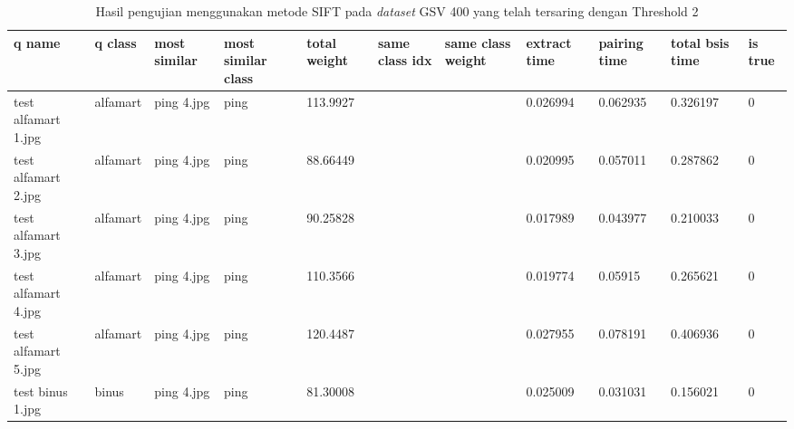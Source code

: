 \begin{landscape}
	\begin{longtable}{|p{2cm}|p{1.5cm}|p{2cm}|p{1.5cm}|p{2cm}|p{1cm}|p{2cm}|p{2cm}|p{2cm}|p{2cm}|p{1cm}|}
		\caption{Hasil pengujian menggunakan metode SIFT pada \textit{dataset} GSV 400 yang telah tersaring dengan Threshold 2} \\
		\hline
		\textbf{q name}      & \textbf{q class} & \textbf{most similar} & \textbf{most similar class} & \textbf{total weight} & \textbf{same class idx} & \textbf{same class weight} & \textbf{extract time} & \textbf{pairing time} & \textbf{total bsis time} & \textbf{is true} \\ \hline
		test alfamart 1.jpg  & alfamart         & ping 4.jpg            & ping                        & 113.9927              &                         &                            & 0.026994              & 0.062935              & 0.326197                 & 0                \\ \hline
		test alfamart 2.jpg  & alfamart         & ping 4.jpg            & ping                        & 88.66449              &                         &                            & 0.020995              & 0.057011              & 0.287862                 & 0                \\ \hline
		test alfamart 3.jpg  & alfamart         & ping 4.jpg            & ping                        & 90.25828              &                         &                            & 0.017989              & 0.043977              & 0.210033                 & 0                \\ \hline
		test alfamart 4.jpg  & alfamart         & ping 4.jpg            & ping                        & 110.3566              &                         &                            & 0.019774              & 0.05915               & 0.265621                 & 0                \\ \hline
		test alfamart 5.jpg  & alfamart         & ping 4.jpg            & ping                        & 120.4487              &                         &                            & 0.027955              & 0.078191              & 0.406936                 & 0                \\ \hline
		test binus 1.jpg     & binus            & ping 4.jpg            & ping                        & 81.30008              &                         &                            & 0.025009              & 0.031031              & 0.156021                 & 0                \\ \hline

\end{longtable}
\end{landscape}
